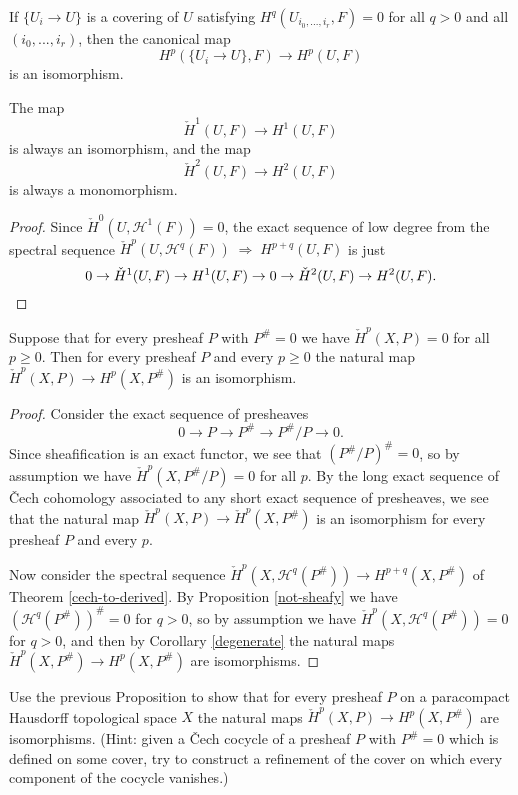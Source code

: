 \begin{cor}\label{good-cover} If $\{U_i\rightarrow U\}$ is a covering of $U$ satisfying $H^q(U_{i_0, ..., i_r}, F) = 0$ for all $q>0$ and all $(i_0, ..., i_r)$, then the canonical map
\[
H^p(\{U_i\rightarrow U\},F) \rightarrow H^p(U,F)
\]
is an isomorphism.
\end{cor}

\begin{cor}\label{h1} The map
\[
\check{H}^1(U,F) \rightarrow H^1(U,F)
\]
is always an isomorphism, and the map
\[
\check{H}^2(U,F) \rightarrow H^2(U,F)
\]
is always a monomorphism.
\end{cor}
\begin{proof} Since $\check{H}^0(U,\mathcal{H}^1(F)) = 0$, the exact sequence of low degree from the spectral sequence $\check{H}^p(U,\mathcal{H}^q(F)) \; \Rightarrow \; H^{p+q}(U,F)$ is just
\[
0 \rightarrow \check{H}^1(U,F) \rightarrow H^1(U,F) \rightarrow 0 \rightarrow \check{H}^2(U,F) \rightarrow H^2(U,F).\qedhere
\]
\end{proof}

\begin{prop} Suppose that for every presheaf $P$ with $P^\# = 0$ we have $\check{H}^p(X,P) = 0$ for all $p \ge 0$. Then for every presheaf $P$ and every $p\ge 0$ the natural map $\check{H}^p(X,P)\rightarrow H^p(X,P^\#)$ is an isomorphism.
\end{prop}
\begin{proof} Consider the exact sequence of presheaves
\[
0 \rightarrow P \rightarrow P^\# \rightarrow P^\#/P \rightarrow 0.
\]
Since sheafification is an exact functor, we see that $(P^\#/P)^\# = 0$, so by assumption we have $\check{H}^p(X,P^\#/P) = 0$ for all $p$. By the long exact sequence of \v{C}ech cohomology associated to any short exact sequence of presheaves, we see that the natural map $\check{H}^p(X,P) \rightarrow\check{H}^p(X,P^\#)$ is an isomorphism for every presheaf $P$ and every $p$.

Now consider the spectral sequence $\check{H}^p(X,\mathcal{H}^q(P^\#))\rightarrow H^{p+q}(X,P^\#)$ of Theorem \ref{cech-to-derived}. By Proposition \ref{not-sheafy} we have $(\mathcal{H}^q(P^\#))^\# = 0$ for $q > 0$, so by assumption we have $\check{H}^p(X,\mathcal{H}^q(P^\#)) = 0$ for $q > 0$, and then by Corollary \ref{degenerate} the natural maps $\check{H}^p(X,P^\#) \rightarrow H^p(X,P^\#)$ are isomorphisms.
\end{proof}

\begin{exer} Use the previous Proposition to show that for every presheaf $P$ on a paracompact Hausdorff topological space $X$ the natural maps $\check{H}^p(X,P)\rightarrow H^p(X,P^\#)$ are isomorphisms. (Hint: given a \v{C}ech cocycle of a presheaf $P$ with $P^\# = 0$ which is defined on some cover, try to construct a refinement of the cover on which every component of the cocycle vanishes.)
\end{exer}

